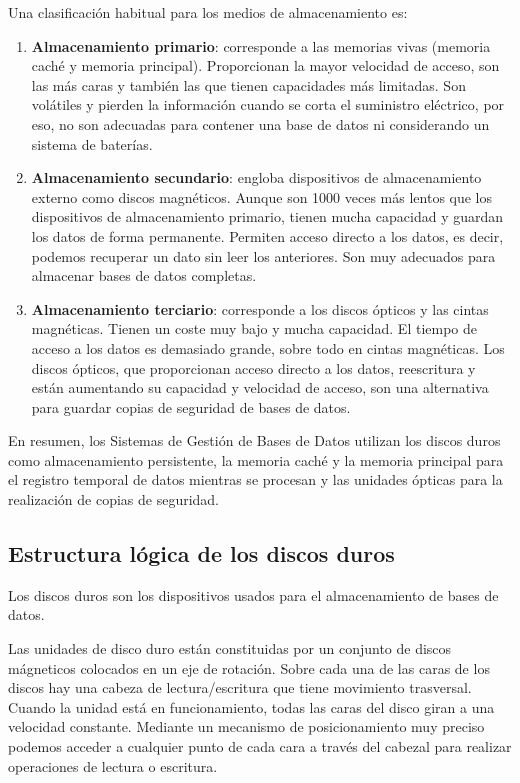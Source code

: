 \documentclass[10pt,a4paper,spanish]{report}
\begin{document}
Una clasificación habitual para los medios de almacenamiento es:
\begin{enumerate}[$\heartsuit$]
    \item \textbf{\textcolor[rgb]{1,0.2,0.3}{Almacenamiento primario}}: corresponde a las memorias vivas (memoria caché y memoria principal). Proporcionan la mayor velocidad de acceso, son las más caras y también las que tienen capacidades más limitadas. Son volátiles y pierden la información cuando se corta el suministro eléctrico, por eso, no son adecuadas para contener una base de datos ni considerando un sistema de baterías.

    \item \textbf{\textcolor[rgb]{1,0.2,0.3}{Almacenamiento secundario}}: engloba dispositivos de almacenamiento externo como discos magnéticos. Aunque son 1000 veces más lentos que los dispositivos de almacenamiento primario, tienen mucha capacidad y guardan los datos de forma permanente. Permiten acceso directo a los datos, es decir, podemos recuperar un dato sin leer los anteriores. Son muy adecuados para almacenar bases de datos completas.

    \item \textbf{\textcolor[rgb]{1,0.2,0.3}{Almacenamiento terciario}}: corresponde a los discos ópticos y las cintas magnéticas. Tienen un coste muy bajo y mucha capacidad. El tiempo de acceso a los datos es demasiado grande, sobre todo en cintas magnéticas. Los discos ópticos, que proporcionan acceso directo a los datos, reescritura y están aumentando su capacidad y velocidad de acceso, son una alternativa para guardar copias de seguridad de bases de datos.
\end{enumerate}

En resumen, los Sistemas de Gestión de Bases de Datos utilizan los discos duros como almacenamiento persistente, la memoria caché y la memoria principal para el registro temporal de datos mientras se procesan y las unidades ópticas para la realización de copias de seguridad.

\textcolor[rgb]{1,0.2,0.3}{\subsection{Estructura lógica de los discos duros}}
Los discos duros son los dispositivos usados para el almacenamiento de bases de datos. 

Las unidades de disco duro están constituidas por un conjunto de discos mágneticos colocados en un eje de rotación. Sobre cada una de las caras de los discos hay una cabeza de lectura/escritura que tiene movimiento trasversal. Cuando la unidad está en funcionamiento, todas las caras del disco giran a una velocidad constante. Mediante un mecanismo de posicionamiento muy preciso podemos acceder a cualquier punto de cada cara a través del cabezal para realizar operaciones de lectura o escritura.
\end{document}
